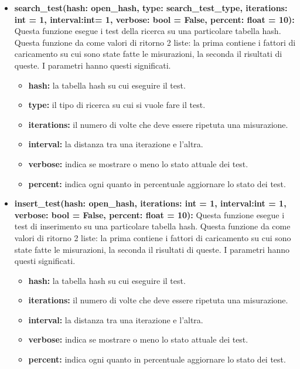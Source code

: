\documentclass{article}
\newcommand{\newlineitem}[1]{\item \textbf{#1} \hfill \break}
\begin{document}
\begin{itemize}
\newlineitem{search\_test(hash: open\_hash, type: search\_test\_type, iterations: int = 1, interval:int= 1, verbose: bool = False, percent: float = 10):}
Questa funzione esegue i test della ricerca su una particolare tabella hash. Questa funzione da come valori di ritorno 2 liste: la prima contiene i fattori di caricamento su cui sono state fatte le misurazioni, la seconda il risultati di queste. I parametri hanno questi significati.
\begin{itemize}
\item \textbf{hash:} la tabella hash su cui eseguire il test.
\item \textbf{type:} il tipo di ricerca su cui si vuole fare il test.
\item \textbf{iterations:} il numero di volte che deve essere ripetuta una misurazione.
\item \textbf{interval:} la distanza tra una iterazione e l'altra.
\item \textbf{verbose:} indica se mostrare o meno lo stato attuale dei test.
\item \textbf{percent:} indica ogni quanto in percentuale aggiornare lo stato dei test.
\end{itemize}

\newlineitem{insert\_test(hash: open\_hash, iterations: int = 1, interval:int = 1, verbose: bool = False, percent: float = 10):}
Questa funzione esegue i test di inserimento su una particolare tabella hash. Questa funzione da come valori di ritorno 2 liste: la prima contiene i fattori di caricamento su cui sono state fatte le misurazioni, la seconda il risultati di queste. I parametri hanno questi significati.
\begin{itemize}
\item \textbf{hash:} la tabella hash su cui eseguire il test.
\item \textbf{iterations:} il numero di volte che deve essere ripetuta una misurazione.
\item \textbf{interval:} la distanza tra una iterazione e l'altra.
\item \textbf{verbose:} indica se mostrare o meno lo stato attuale dei test.
\item \textbf{percent:} indica ogni quanto in percentuale aggiornare lo stato dei test.
\end{itemize}


\end{itemize}
\end{document}
